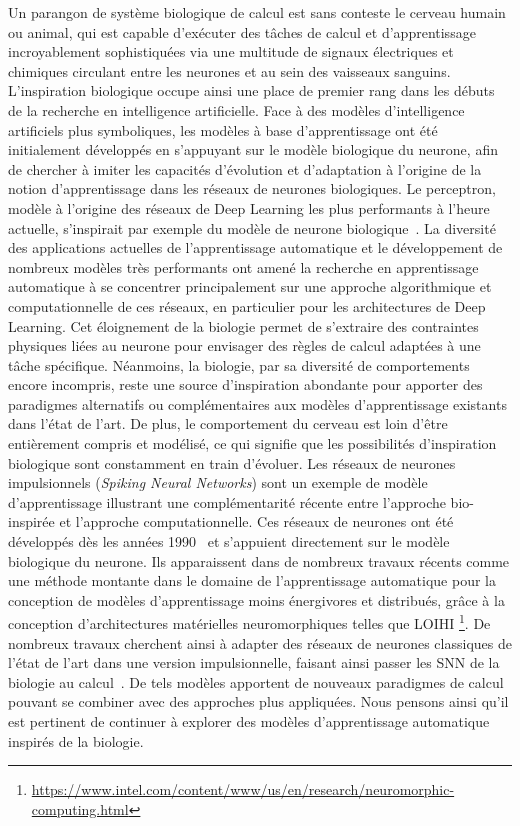 Un parangon de système biologique de calcul est sans conteste le cerveau humain ou animal, qui est capable d'exécuter des tâches de calcul et d'apprentissage incroyablement sophistiquées via une multitude de signaux électriques et chimiques circulant entre les neurones et au sein des vaisseaux sanguins.
L'inspiration biologique occupe ainsi une place de premier rang dans les débuts de la recherche en intelligence artificielle.
Face à des modèles d'intelligence artificiels plus symboliques, les modèles à base d'apprentissage ont été initialement développés en s'appuyant sur le modèle biologique du neurone, afin de chercher à imiter les capacités d'évolution et d'adaptation à l'origine de la notion d'apprentissage dans les réseaux de neurones biologiques.
Le perceptron, modèle à l'origine des réseaux de Deep Learning les plus performants à l'heure actuelle, s'inspirait par exemple du modèle de neurone biologique~\cite{McCulloch1990ALC}.
La diversité des applications actuelles de l'apprentissage automatique et le développement de nombreux modèles très performants ont amené la recherche en apprentissage automatique à se concentrer principalement sur une approche algorithmique et computationnelle de ces réseaux, en particulier pour les architectures de Deep Learning. 
Cet éloignement de la biologie permet de s'extraire des contraintes physiques liées au neurone pour envisager des règles de calcul adaptées à une tâche spécifique.
Néanmoins, la biologie, par sa diversité de comportements encore incompris, reste une source d'inspiration abondante pour apporter des paradigmes alternatifs ou complémentaires aux modèles d'apprentissage existants dans l'état de l'art. De plus, le comportement du cerveau est loin d'être entièrement compris et modélisé, ce qui signifie que les possibilités d'inspiration biologique sont constamment en train d'évoluer.
Les réseaux de neurones impulsionnels (\emph{Spiking Neural Networks}) sont un exemple de modèle d'apprentissage illustrant une complémentarité récente entre l'approche bio-inspirée et l'approche computationnelle.
Ces réseaux de neurones ont été développés dès les années 1990~\cite{Maass1996NetworksOS} et s'appuient directement sur le modèle biologique du neurone.
Ils apparaissent dans de nombreux travaux récents comme une méthode montante dans le domaine de l'apprentissage automatique pour la conception de modèles d'apprentissage moins énergivores et distribués, grâce à la conception d'architectures matérielles neuromorphiques telles que LOIHI \footnote{\url{https://www.intel.com/content/www/us/en/research/neuromorphic-computing.html}}. De nombreux travaux cherchent ainsi à adapter des réseaux de neurones classiques de l'état de l'art dans une version impulsionnelle, faisant ainsi passer les SNN de la biologie au calcul~\cite{Schuman2022OpportunitiesFN}.
De tels modèles apportent de nouveaux paradigmes de calcul pouvant se combiner avec des approches plus appliquées.
Nous pensons ainsi qu'il est pertinent de continuer à explorer des modèles d'apprentissage automatique inspirés de la biologie.

